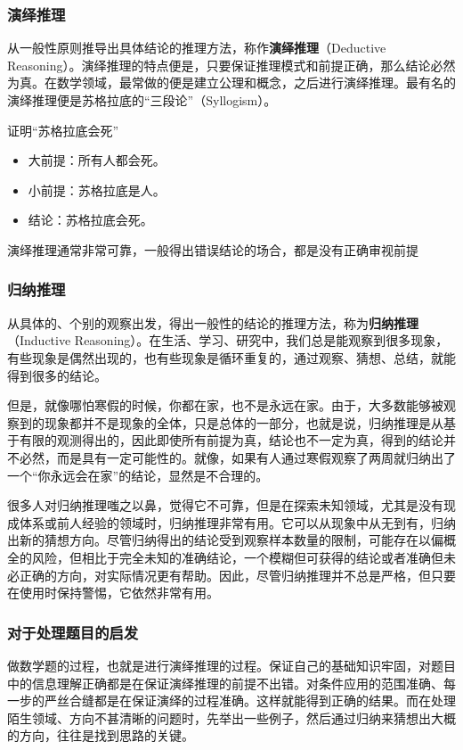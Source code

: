 \subsubsection{演绎推理}

从一般性原则推导出具体结论的推理方法，称作\textbf{演绎推理}（Deductive Reasoning）。演绎推理的特点便是，只要保证推理模式和前提正确，那么结论必然为真。在数学领域，最常做的便是建立公理和概念，之后进行演绎推理。最有名的演绎推理便是苏格拉底的“三段论”（Syllogism）。

\begin{example}{证明“苏格拉底会死”}
\begin{itemize}
\item 大前提：所有人都会死。
\item 小前提：苏格拉底是人。
\item 结论：苏格拉底会死。
\end{itemize}
\end{example}

演绎推理通常非常可靠，一般得出错误结论的场合，都是没有正确审视前提

\subsubsection{归纳推理}

从具体的、个别的观察出发，得出一般性的结论的推理方法，称为\textbf{归纳推理}（Inductive Reasoning）。在生活、学习、研究中，我们总是能观察到很多现象，有些现象是偶然出现的，也有些现象是循环重复的，通过观察、猜想、总结，就能得到很多的结论。

但是，就像哪怕寒假的时候，你都在家，也不是永远在家。由于，大多数能够被观察到的现象都并不是现象的全体，只是总体的一部分，也就是说，归纳推理是从基于有限的观测得出的，因此即使所有前提为真，结论也不一定为真，得到的结论并不必然，而是具有一定可能性的。就像，如果有人通过寒假观察了两周就归纳出了一个“你永远会在家”的结论，显然是不合理的。

很多人对归纳推理嗤之以鼻，觉得它不可靠，但是在探索未知领域，尤其是没有现成体系或前人经验的领域时，归纳推理非常有用。它可以从现象中从无到有，归纳出新的猜想方向。尽管归纳得出的结论受到观察样本数量的限制，可能存在以偏概全的风险，但相比于完全未知的准确结论，一个模糊但可获得的结论或者准确但未必正确的方向，对实际情况更有帮助。因此，尽管归纳推理并不总是严格，但只要在使用时保持警惕，它依然非常有用。

\subsubsection{对于处理题目的启发}

做数学题的过程，也就是进行演绎推理的过程。保证自己的基础知识牢固，对题目中的信息理解正确都是在保证演绎推理的前提不出错。对条件应用的范围准确、每一步的严丝合缝都是在保证演绎的过程准确。这样就能得到正确的结果。而在处理陌生领域、方向不甚清晰的问题时，先举出一些例子，然后通过归纳来猜想出大概的方向，往往是找到思路的关键。
